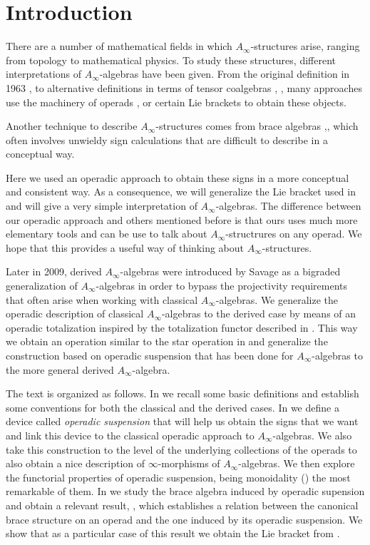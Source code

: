 \chapter{Introduction}

There are a number of mathematical fields in which $A_\infty$-structures arise, ranging from topology to mathematical physics. To study these structures, different interpretations of $A_\infty$-algebras have been given. From the original definition in 1963 \cite{STASHEFF}, to alternative definitions in terms of tensor coalgebras \cite{keller}, \cite{penkava}, many approaches use the machinery of operads \cite{LRW}, \cite{lodayvallette} or certain Lie brackets \cite{RW} to obtain these objects. 

Another technique to describe $A_\infty$-structures comes from brace algebras \cite{GV},\cite{lada}, which often involves unwieldy sign calculations that are difficult to describe in a conceptual way.

Here we used an operadic approach to obtain these signs in a more conceptual and consistent way. As a consequence, we will generalize the Lie bracket used in \cite{RW} and will give a very simple interpretation of $A_\infty$-algebras. The difference between our operadic approach and others mentioned before is that ours uses much more elementary tools and can be use to talk about $A_\infty$-structrures on any operad. We hope that this provides a useful way of thinking about $A_\infty$-structures.

Later in 2009, derived $A_\infty$-algebras were introduced by Savage \cite{sagave} as a bigraded generalization of $A_\infty$-algebras in order to bypass the projectivity requirements that often arise when working with classical $A_\infty$-algebras. We generalize the operadic description of classical $A_\infty$-algebras to the derived case by means of an operadic totalization inspired by the totalization functor described in \cite{whitehouse}. This way we obtain an operation similar to the star operation in \cite{LRW} and generalize the construction based on operadic suspension that has been done for $A_\infty$-algebras to the more general derived $A_\infty$-algebra.

The text is organized as follows. In  we recall some basic definitions and establish some conventions for both the classical and the derived cases. In  we define a device called \emph{operadic suspension} that will help us obtain the signs that we want and link this device to the classical operadic approach to $A_\infty$-algebras. We also take this construction to the level of the underlying collections of the operads to also obtain a nice description of $\infty$-morphisms of $A_\infty$-algebras. We then explore the functorial properties of operadic suspension, being monoidality () the most remarkable of them. In  we study the brace algebra induced by operadic supension and obtain a relevant result, , which establishes a relation between the canonical brace structure on an operad and the one induced by its operadic suspension. We show that as a particular case of this result we obtain the Lie bracket from \cite{RW}.

